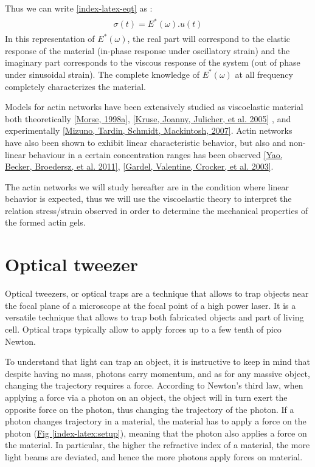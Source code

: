 \documentclass[A4paperpaper,11pt,english]{sphinxmanual}
\begin{document}
Thus we can write \eqref{index-latex-eqt} as :
\label{index-latex:equation-eqa17}\begin{gather}
\begin{split}\sigma(t) = E^*(\omega).u(t)\end{split}\label{index-latex-eqa17}
\end{gather}
In this representation of \(E^*(\omega)\), the real part will correspond to
the elastic response of the material (in-phase response
under oscillatory strain) and the imaginary part corresponds to the viscous response
of the system (out of phase under sinusoidal strain). The complete knowledge of
\(E^*(\omega)\) at all frequency completely characterizes the material.

Models for actin networks have been extensively studied as viscoelastic material
both theoretically {\hyperref[index-latex:morse1998a]{{[}Morse,  1998a{]}}}, {\hyperref[index-latex:kruse2005]{{[}Kruse, Joanny, Julicher,  et al.  2005{]}}} , and  experimentally
{\hyperref[index-latex:mizuno2007]{{[}Mizuno, Tardin, Schmidt, Mackintosh,  2007{]}}}.  Actin networks have also been shown to exhibit linear
characteristic behavior, but also and non-linear behaviour  in a certain concentration ranges has been observed {\hyperref[index-latex:yao2011]{{[}Yao, Becker, Broedersz,  et al.  2011{]}}}, {\hyperref[index-latex:gardel2003]{{[}Gardel, Valentine, Crocker,  et al.  2003{]}}}.

The actin networks we will study hereafter are in the condition where linear
behavior is expected, thus we will use the viscoelastic theory to interpret the
relation stress/strain observed in order to determine the mechanical properties
of the formed actin gels.


\section{Optical tweezer}
\label{index-latex:optical-tweezer}\label{index-latex:id77}
Optical tweezers, or optical traps are a technique that allows to trap objects
near the focal plane of a microscope at the focal point of a high power laser.
It is a versatile technique that allows to trap both fabricated objects and
part of living cell. Optical traps typically allow to apply forces up to a few tenth of
pico Newton.

To understand that light can trap an object, it is instructive to keep in mind
that despite having no mass, photons carry momentum, and as for any massive
object, changing the trajectory requires a force.  According to Newton's third
law, when applying a force via a photon on an object, the object will in turn
exert the opposite force on the photon, thus changing the trajectory of the
photon. If a photon changes trajectory in a material, the material has to apply a
force on the photon (\hyperref[index-latex:setup]{Fig  \ref*{index-latex:setup}}), meaning that the photon also applies a force on the
material. In particular, the higher the refractive index of a material, the
more light beams are deviated, and hence the more photons apply forces on
material.
\end{document}
